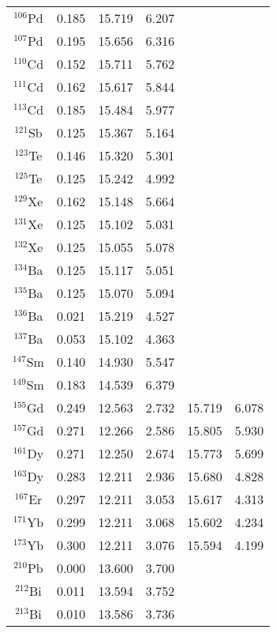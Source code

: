 \documentclass[twocolumn,showpacs,superscriptaddress,amsmath,amssymb,prc,preprintnumbers]{revtex4-1}
\begin{document}
\begin{center}
\begin{longtable}{c@{\extracolsep{\fill}}ccccc}
        $^{106}$Pd & 0.185  & 15.719  & 6.207  &  &  \\
        $^{107}$Pd & 0.195  & 15.656  & 6.316  &  &  \\
        $^{110}$Cd & 0.152  & 15.711  & 5.762  &  &  \\
        $^{111}$Cd & 0.162  & 15.617  & 5.844  &  &  \\
        $^{113}$Cd & 0.185  & 15.484  & 5.977  &  &  \\
        $^{121}$Sb & 0.125  & 15.367  & 5.164  &  &  \\
        $^{123}$Te & 0.146  & 15.320  & 5.301  &  &  \\
        $^{125}$Te & 0.125  & 15.242  & 4.992  &  &  \\
        $^{129}$Xe & 0.162  & 15.148  & 5.664  &  &  \\
        $^{131}$Xe & 0.125  & 15.102  & 5.031  &  &  \\
        $^{132}$Xe & 0.125  & 15.055  & 5.078  &  &  \\
        $^{134}$Ba & 0.125  & 15.117  & 5.051  &  &  \\
        $^{135}$Ba & 0.125  & 15.070  & 5.094  &  &  \\
        $^{136}$Ba & 0.021  & 15.219  & 4.527  &  &  \\
        $^{137}$Ba & 0.053  & 15.102  & 4.363  &  &  \\
        $^{147}$Sm & 0.140  & 14.930  & 5.547  &  &  \\
        $^{149}$Sm & 0.183  & 14.539  & 6.379  &  &  \\
        $^{155}$Gd & 0.249  & 12.563  & 2.732  & 15.719  & 6.078  \\
        $^{157}$Gd & 0.271  & 12.266  & 2.586  & 15.805  & 5.930  \\
        $^{161}$Dy & 0.271  & 12.250  & 2.674  & 15.773  & 5.699  \\
        $^{163}$Dy & 0.283  & 12.211  & 2.936  & 15.680  & 4.828  \\
        $^{167}$Er & 0.297  & 12.211  & 3.053  & 15.617  & 4.313  \\
        $^{171}$Yb & 0.299  & 12.211  & 3.068  & 15.602  & 4.234  \\
        $^{173}$Yb & 0.300  & 12.211  & 3.076  & 15.594  & 4.199  \\
        $^{210}$Pb & 0.000 & 13.600 & 3.700  &  &  \\
        $^{212}$Bi & 0.011  & 13.594  & 3.752  &  &  \\
        $^{213}$Bi & 0.010  & 13.586  & 3.736  &  &  \\

\end{longtable}
\end{center}
\end{document}
